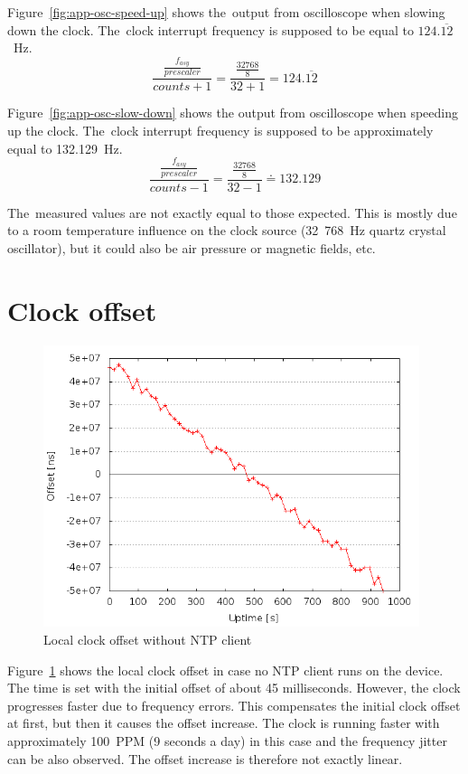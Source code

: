 Figure~\ref{fig:app-osc-speed-up} shows the~output from oscilloscope
when slowing down the clock.
The~clock interrupt frequency
is supposed to be equal to $124.\overline{12}$~Hz.
$$\frac{\frac{f_{asy}}{prescaler}}{counts + 1} = \frac{\frac{32768}{8}}{32+1} = 124.\overline{12}$$

Figure~\ref{fig:app-osc-slow-down} shows the output from oscilloscope
when speeding up the clock.
The~clock interrupt frequency
is supposed to be approximately equal to 132.129~Hz.
$$\frac{\frac{f_{asy}}{prescaler}}{counts - 1} = \frac{\frac{32768}{8}}{32-1} \doteq 132.129$$

The~measured values are not exactly equal to those expected.
This is mostly due to a room temperature influence on the clock source
(32~768~Hz quartz crystal oscillator),
but it could also be air pressure or magnetic fields, etc.

\section{Clock offset}
\begin{figure}[H]
  \centering
  \includegraphics[width=11cm,keepaspectratio]{fig/no-ntp.png}
  \caption{Local clock offset without NTP client}
  \label{fig:measurements-no-ntp}
\end{figure}
Figure~\ref{fig:measurements-no-ntp} shows the local clock offset
in case no NTP client runs on the device.
The time is set with the initial offset of about 45 milliseconds.
However, the clock progresses faster due to frequency errors.
This compensates the initial clock offset at first,
but then it causes the offset increase.
The clock is running faster with approximately 100~PPM
(9 seconds a day) in this case and
the frequency jitter can be also observed.
The offset increase is therefore not exactly linear.

